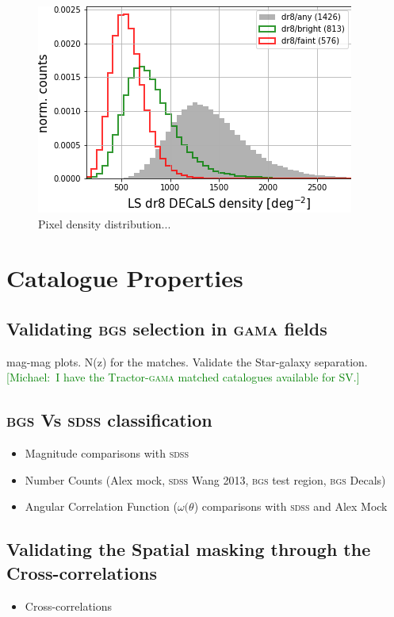 \documentclass[fleqn,usenatbib]{mnras}
\newcommand{\mike}[1]{~\newline\noindent \textcolor{Green}{{ [Michael:~{#1}]\\}}}
\newcommand{\BGS}{\textsc{bgs}\xspace}
\newcommand{\GAMA}{\textsc{gama}\xspace}
\newcommand{\SDSS}{\textsc{sdss}\xspace}
\newcommand{\TRACTOR}{\textsc{T}ractor\xspace}
\begin{document}
\begin{figure}
	\includegraphics[width=\columnwidth]{images/pixhist_bright_faint.png}
    \caption{Pixel density distribution...}
    \label{fig:pixdens}
\end{figure}

\section{Catalogue Properties}
\subsection{Validating \BGS selection in \GAMA fields}
mag-mag plots. N(z) for the matches. Validate the Star-galaxy separation.
\mike{I have the \TRACTOR-\GAMA matched catalogues available for SV.}
\subsection{\BGS Vs \SDSS classification}
\begin{itemize}
    \item Magnitude comparisons with \SDSS
    \item Number Counts (Alex mock, \SDSS Wang 2013, \BGS test region, \BGS Decals)
    \item Angular Correlation Function ($\omega(\theta$) comparisons with \SDSS and Alex Mock
\end{itemize}

\subsection{Validating the Spatial masking through the Cross-correlations}
\begin{itemize}
    \item Cross-correlations
\end{itemize}
\end{document}
